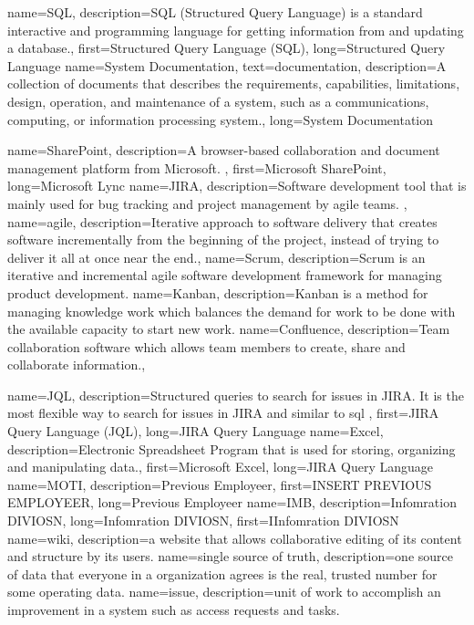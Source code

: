 
{
	name={SQL},
	description={SQL (Structured Query Language) is a standard interactive and programming language for getting information from and updating a database.},
	first={Structured Query Language (SQL)},
	long={Structured Query Language}
}
{
	name={System Documentation},
	text={documentation},
	description={A collection of documents that describes the requirements, \newline capabilities, limitations, design, operation, and maintenance of a system, such as a communications, computing, or information processing system.},
	long={System Documentation}
}

{
	name={SharePoint},
	description={A browser-based collaboration and document management platform from Microsoft. },
	first={Microsoft SharePoint},
	long={Microsoft Lync}
}
{
	name={JIRA},
	description={Software development tool  that is mainly used for bug tracking and project management by \gls{agile} teams. },
}
{
	name={agile},
	description={Iterative approach to software delivery that creates software incrementally from the beginning of the project, instead of trying to deliver it all at once near the end.},
}
{
	name={Scrum},
	description={Scrum is an iterative and incremental agile software development framework for managing product development.}
}
{
	name={Kanban},
	description={Kanban is a method for managing knowledge work which balances the demand for work to be done with the available capacity to start new work.}
}
{
	name={Confluence},
	description={Team collaboration software which allows team members to create, share and collaborate information.},
}

{
	name={JQL},
	description={Structured queries to search for issues in JIRA. It is the most flexible way to search for issues in JIRA and similar to \gls{sql} },
	first={JIRA Query Language (JQL)},
	long={JIRA Query Language}
}
{
	name={Excel},
	description={Electronic Spreadsheet Program that is used for storing, organizing and manipulating data.},
	first={Microsoft Excel},
	long={JIRA Query Language}
}
{
	name={MOTI},
	description={Previous Employeer},
	first={INSERT PREVIOUS EMPLOYEER},
	long={Previous Employeer}
}
{
	name={IMB},
	description={Infomration DIVIOSN},
	long={Infomration DIVIOSN},
	first={IInfomration DIVIOSN}
}
{
	name={wiki},
	description={a website that allows collaborative editing of its content and structure by its users.}
}
{
	name={single source of truth},
	description={one source of data that everyone in a organization agrees is the real, trusted number for some operating data.}
}
{
	name={issue},
	description={unit of work to accomplish an improvement in a system such as access requests and tasks.}
}

